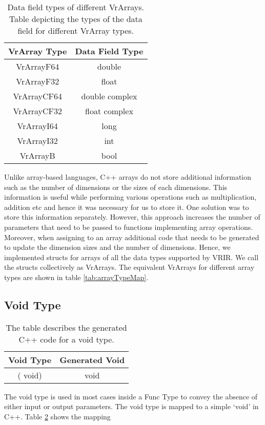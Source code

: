 \begin{table}[htbp]
\centering
\begin{tabular}{|c|c|}
\hline
VrArray Type & Data Field Type \\ \hline
VrArrayF64   & double          \\ \hline
VrArrayF32   & float           \\ \hline
VrArrayCF64  & double complex  \\ \hline
VrArrayCF32  & float complex  \\ \hline
VrArrayI64   & long            \\ \hline
VrArrayI32   & int             \\ \hline
VrArrayB     & bool            \\ \hline
\end{tabular}
\caption[Data field types of different VrArrays]{Data field types of different VrArrays. Table depicting the types of the data field for different VrArray types.}
\label{tab:arrayDataMap}
\end{table}
Unlike array-based languages, C++ arrays do not store additional information such as the number of dimensions or the sizes of each dimensions. This information is useful while performing various operations such as multiplication, addition etc and hence it was necessary for us to store it. One solution was to store this information separately. However, this approach increases the number of parameters that need to be passed to functions implementing array operations. Moreover, when assigning to an array additional code that needs to be generated to update the dimension sizes and the number of dimensions. Hence, we implemented structs for arrays of all the data types supported by VRIR. We call the structs collectively as VrArrays. The equivalent VrArrays for different array types are shown in table \ref{tab:arrayTypeMap}.

\subsection{Void Type}
\begin{table}[htbp]
\centering
\begin{tabular}{|c|c|}
\hline
Void Type & Generated Void \\ \hline
( void)   & void           \\ \hline
\end{tabular}
\caption[voidTypeMapping]{The table describes the generated C++ code for a void type.}
\label{tab:voidTypeMap}
\end{table}
The void type is used in most cases inside a Func Type to convey the absence of either input or output parameters. The void type is mapped to a simple `void' in C++. Table \ref{tab:voidTypeMap} shows the mapping
